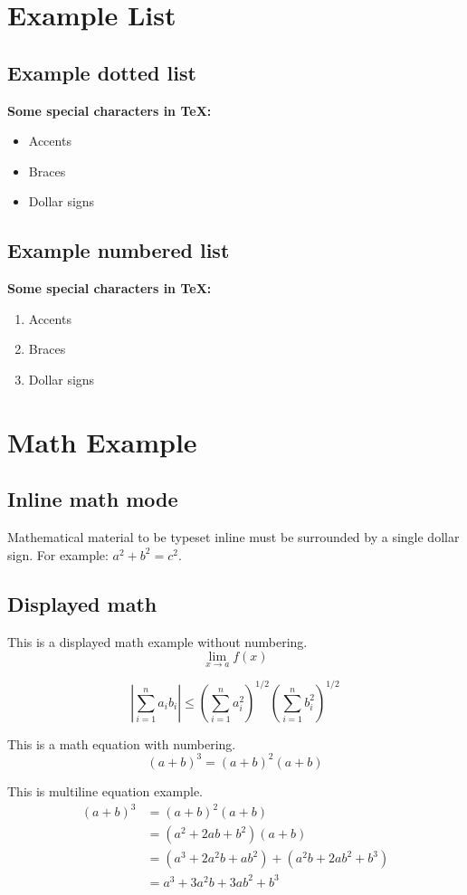 \section{Example List}
\subsection{Example dotted list}
\smallskip
\textbf{Some special characters in TeX:}
\begin{itemize}
\item Accents
\item Braces
\item Dollar signs
\end{itemize}
\subsection{Example numbered list}
\smallskip
\textbf{Some special characters in TeX:}
\begin{enumerate}
\item Accents
\item Braces
\item Dollar signs
\end{enumerate}
\section{Math Example}
\subsection{Inline math mode}
Mathematical material to be typeset inline must be surrounded by a
single dollar sign. For example: $a^2 + b^2 = c^2$.
\subsection{Displayed math}
This is a displayed math example without numbering.
\[
\lim_{x \to a}f(x)
\]

\[
\left|\sum_{i=1}^n a_ib_i\right| \le \left(\sum_{i=1}^n
a_i^2\right)^{1/2} \left(\sum_{i=1}^n b_i^2\right)^{1/2}
\]

This is a math equation with numbering.
\begin{equation}
(a+b)^3 = (a+b)^2(a+b)
\end{equation}

This is multiline equation example.
\begin{align}
(a+b)^3 &= (a+b)^2(a+b)\\
&=(a^2+2ab+b^2)(a+b)\\
&=(a^3+2a^2b+ab^2) + (a^2b+2ab^2+b^3)\\
&=a^3+3a^2b+3ab^2+b^3
\end{align}

